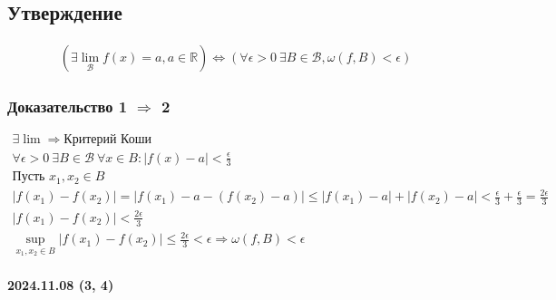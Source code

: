 \documentclass{article}
\begin{document}
\subsection{Утверждение}
\begin{gather*}
    \left( \exists \lim_{\mathcal{B}} f(x) = a, a \in \mathbb{R} \right) \Leftrightarrow 
    \left( \forall \epsilon > 0 ~ \exists B \in \mathcal{B}, \omega(f, B) < \epsilon \right)
\end{gather*}

\subsubsection{Доказательство 1 $\Rightarrow$ 2}
\begin{gather*}
    \exists \lim \Rightarrow \text{Критерий Коши} \\
    \forall \epsilon > 0 ~ \exists B \in \mathcal{B} ~ \forall x \in B: |f(x) - a| < \frac{\epsilon}{3} \\
    \text{Пусть } x_1, x_2 \in B \\
    |f(x_1) - f(x_2)| = |f(x_1) - a - (f(x_2) - a)| \le |f(x_1) - a| + |f(x_2) - a| < \frac{\epsilon}{3} + \frac{\epsilon}{3} = \frac{2 \epsilon}{3} \\
    |f(x_1) - f(x_2)| < \frac{2 \epsilon}{3} \\
    \sup_{x_1, x_2 \in B} |f(x_1) - f(x_2)| \le \frac{2 \epsilon}{3} < \epsilon \Rightarrow
    \omega(f, B) < \epsilon
\end{gather*}

\paragraph{2024.11.08 (3, 4)}
\end{document}
